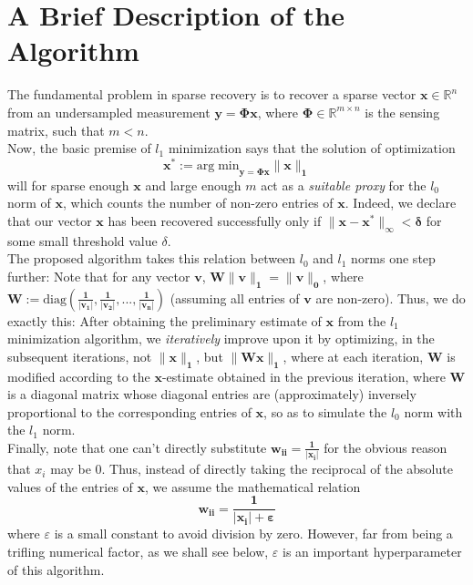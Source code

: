 \documentclass[a4paper,14pt]{article}
\numberwithin{definition}{section}
\numberwithin{mytheorem}{subsection}
\begin{document}
\section{A Brief Description of the Algorithm}
The fundamental problem in sparse recovery is to recover a sparse vector $\boldsymbol{x}\in\mathbb{R}^n$ from an undersampled measurement $\boldsymbol{y = \Phi x}$, where $\boldsymbol{\Phi}\in\mathbb{R}^{m\times n}$ is the sensing matrix, such that $m < n$. \\
Now, the basic premise of $l_1$ minimization says that the solution of optimization
$$\boldsymbol{x^* := \mathrm{arg\;min}_{y = \Phi x}\lVert x\rVert_1}$$
will for sparse enough $\boldsymbol{x}$ and large enough $m$ act as a \emph{suitable proxy} for the $l_0$ norm of $\boldsymbol{x}$, which counts the number of non-zero entries of $\boldsymbol{x}$. Indeed, we declare that our vector $\boldsymbol{x}$ has been recovered successfully only if $\boldsymbol{\lVert x - x^*\rVert_\infty < \delta}$ for some small threshold value $\delta$.\\
The proposed algorithm takes this relation between $l_0$ and $l_1$ norms one step further: Note that for any vector $\boldsymbol{v}$, $\boldsymbol{W\lVert v\rVert_1 = \lVert v\rVert_0}$, where $\boldsymbol{W := \mathrm{diag}(\frac{1}{|v_1|}, \frac{1}{|v_2|},..., \frac{1}{|v_n|})}$ (assuming all entries of $\boldsymbol{v}$ are non-zero). Thus, we do exactly this: After obtaining the preliminary estimate of $\boldsymbol{x}$ from the $l_1$ minimization algorithm, we \emph{iteratively} improve upon it by optimizing, in the subsequent iterations, not $\boldsymbol{\lVert x\rVert_1}$, but $\boldsymbol{\lVert Wx\rVert_1}$, where at each iteration, $\boldsymbol{W}$ is modified according to the $\boldsymbol{x}$-estimate obtained in the previous iteration, where $\boldsymbol{W}$ is a diagonal matrix whose diagonal entries are (approximately) inversely proportional to the corresponding entries of $\boldsymbol{x}$, so as to simulate the $l_0$ norm with the $l_1$ norm.\\
Finally, note that one can't directly substitute $\boldsymbol{w_{ii} = \frac{1}{|x_i|}}$ for the obvious reason that $x_i$ may be 0. Thus, instead of directly taking the reciprocal of the absolute values of the entries of $\boldsymbol{x}$, we assume the mathematical relation
$$\boldsymbol{w_{ii} = \frac{1}{|x_i|+\varepsilon}}$$
where $\varepsilon$ is a small constant to avoid division by zero. However, far from being a trifling numerical factor, as we shall see below, $\varepsilon$ is an important hyperparameter of this algorithm.
\end{document}
